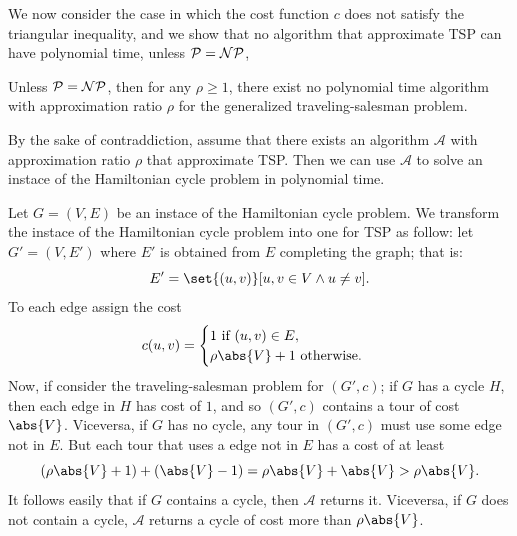 \documentclass{subfiles}
\begin{document}
    We now consider the case in which the cost function \(c\) 
        does not satisfy the triangular inequality,
        and we show that no algorithm that approximate TSP can have polynomial time, 
        unless \(\mathcal{P} = \operatorname{\mathcal{NP}}\),

    \begin{theorem*}
        Unless \(\mathcal{P} = \operatorname{\mathcal{NP}}\), then for any \(\rho \ge 1\),
        there exist no polynomial time algorithm with approximation ratio \(\rho\)
        for the generalized traveling-salesman problem.
    \end{theorem*}

    \begin{proof*}
        By the sake of contraddiction, assume that there exists an algorithm \(\mathcal{A}\)
            with approximation ratio \(\rho\) that approximate TSP. Then we can use \(\mathcal{A}\)
            to solve an instace of the Hamiltonian cycle problem in polynomial time.

        Let \(G = (V, E)\) be an instace of the Hamiltonian cycle problem.
            We transform the instace of the Hamiltonian cycle problem into one for TSP as follow:
            let \(G' = (V, E')\) where \(E'\) is obtained from \(E\) completing the graph;
            that is:
            \[
                E' = \set{(u, v)}[u, v \in V \land u \ne v].
            \]
        To each edge assign the cost 
        \[
            c(u, v) = \begin{cases}
                1 \text{ if } (u, v) \in E, \\
                \rho \abs{V} + 1 \text{ otherwise.}
            \end{cases}
        \]
        Now, if consider the traveling-salesman problem for \((G', c)\);
            if \(G\) has a cycle \(H\), then each edge in \(H\) has cost of \(1\),
            and so \((G', c)\) contains a tour of cost \(\abs{V}\).
            Viceversa, if \(G\) has no cycle, any tour in \((G', c)\) must use some edge not in \(E\).
            But each tour that uses a edge not in \(E\) has a cost of at least 
            \[
                (\rho \abs{V} + 1) + (\abs{V} - 1) = \rho\abs{V} + \abs{V} > \rho\abs{V}.
            \]
        It follows easily that if \(G\) contains a cycle, then \(\mathcal{A}\) returns it.
            Viceversa, if \(G\) does not contain a cycle, \(\mathcal{A}\) returns a cycle of 
            cost more than \(\rho\abs{V}\).
    \end{proof*}
\end{document}
